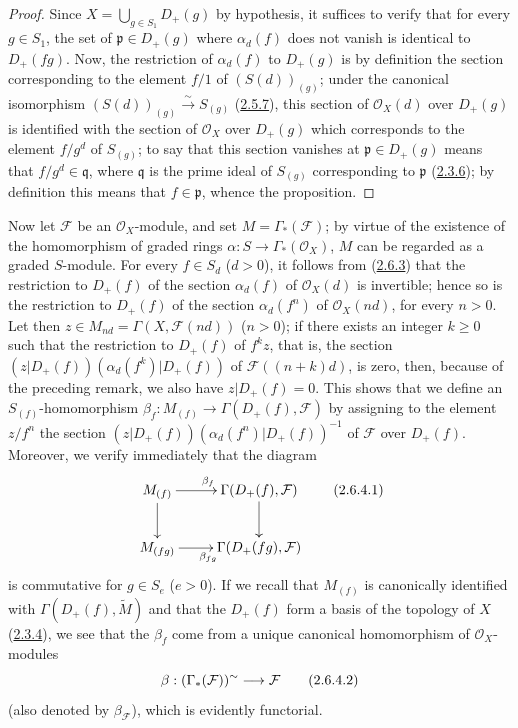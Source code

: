 \begin{proof}
Since $X=\bigcup_{g\in S_1}D_+(g)$ by hypothesis, it suffices to verify that
for every $g\in S_1$, the set of $\mathfrak{p}\in D_+(g)$ where
$\alpha_d(f)$ does not vanish is identical to $D_+(fg)$. Now, the
restriction of $\alpha_d(f)$ to $D_+(g)$ is by definition the section
corresponding to the element $f/1$ of $(S(d))_{(g)}$; under the canonical
isomorphism
$(S(d))_{(g)}\xrightarrow{\sim}S_{(g)}$
(\hyperref[II.2.5.7]{2.5.7}), this section of $\mathcal{O}_X(d)$
over $D_+(g)$ is identified with the section of $\mathcal{O}_X$ over
$D_+(g)$ which corresponds to the element $f/g^d$ of $S_{(g)}$; to say that
this section vanishes at $\mathfrak{p}\in D_+(g)$ means that
$f/g^d\in\mathfrak{q}$, where $\mathfrak{q}$ is the prime ideal of $S_{(g)}$
corresponding to $\mathfrak{p}$ (\hyperref[II.2.3.6]{2.3.6}); by
definition this means that $f\in\mathfrak{p}$, whence the proposition.
\end{proof}

\begin{env}[2.6.4]
\label{II.2.6.4}
Now let $\mathcal{F}$ be an $\mathcal{O}_X$-module, and set
$M=\Gamma_*(\mathcal{F})$; by virtue of the existence of the homomorphism
of graded rings $\alpha:S\to\Gamma_*(\mathcal{O}_X)$, $M$ can be
regarded as a graded $S$-module. For every $f\in S_d$ ($d>0$), it
follows from (\hyperref[II.2.6.3]{2.6.3}) that the restriction to
$D_+(f)$ of the section $\alpha_d(f)$ of $\mathcal{O}_X(d)$ is invertible;
hence so is the restriction to $D_+(f)$ of the section $\alpha_d(f^n)$ of
$\mathcal{O}_X(nd)$, for every $n>0$. Let then
$z\in M_{nd}=\Gamma(X,\mathcal{F}(nd))$ ($n>0$); if there exists an integer
$k\geq0$ such that the restriction to $D_+(f)$ of $f^kz$, that is, the
section
$(z|D_+(f))(\alpha_d(f^k)|D_+(f))$ of $\mathcal{F}((n+k)d)$, is zero,
then, because of the preceding remark, we also have $z|D_+(f)=0$. This
shows that we define an $S_{(f)}$-homomorphism
$\beta_f:M_{(f)}\to\Gamma(D_+(f),\mathcal{F})$ by assigning to
the element $z/f^n$ the section
$(z|D_+(f))(\alpha_d(f^n)|D_+(f))^{-1}$ of $\mathcal{F}$ over
$D_+(f)$. Moreover, we verify immediately that the diagram
\[
\label{II.2.6.4.1}
  \xymatrix{
    M_{(f)}\ar[r]^{\beta_f}\ar[d]
    & \Gamma(D_+(f),\mathcal{F})\ar[d]\\
    M_{(fg)}\ar[r]_{\beta_{fg}}
    & \Gamma(D_+(fg),\mathcal{F})
  }
\tag{2.6.4.1}
\]
is commutative for $g\in S_e$ ($e>0$). If we recall that $M_{(f)}$
is canonically identified with $\Gamma(D_+(f),\widetilde{M})$ and that the
$D_+(f)$ form a basis of the topology of $X$
(\hyperref[II.2.3.4]{2.3.4}), we see that the $\beta_f$ come from a
unique canonical homomorphism of $\mathcal{O}_X$-modules
\[
\label{II.2.6.4.2}
  \beta:(\Gamma_*(\mathcal{F}))^{\sim}
  \longrightarrow\mathcal{F}
\tag{2.6.4.2}
\]
(also denoted by $\beta_{\mathcal{F}}$), which is evidently functorial.
\end{env}

